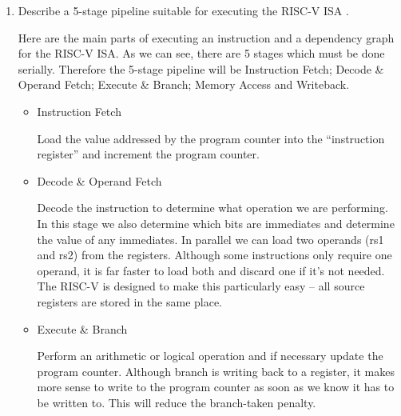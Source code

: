 \documentclass[10pt,\jkfside,a4paper]{article}
\begin{document}
\begin{enumerate}

\item Describe a 5-stage pipeline suitable for executing the RISC-V ISA .

Here are the main parts of executing an instruction and a dependency
graph for the RISC-V ISA. As we can see, there are 5 stages which must be done
serially. Therefore the 5-stage pipeline will be Instruction Fetch;
Decode \& Operand Fetch; Execute \& Branch; Memory Access and Writeback.

\begin{center}
\end{center}

\begin{itemize}

\item Instruction Fetch

Load the value addressed by the program counter into the ``instruction
register'' and increment the program counter.

\item Decode \& Operand Fetch

Decode the instruction to determine what operation we are performing. In
this stage we also determine which bits are immediates and determine the
value of any immediates. In parallel we can load two operands (rs1 and rs2)
from the registers. Although some instructions only require one operand, it
is far faster to load both and discard one if it's not needed. The RISC-V is
designed to make this particularly easy -- all source registers are stored
in the same place.

\item Execute \& Branch

Perform an arithmetic or logical operation and if necessary update the
program counter. Although branch is writing back to a register, it makes
more sense to write to the program counter as soon as we know it has to be
written to. This will reduce the branch-taken penalty.


\end{itemize}
\end{enumerate}
\end{document}
